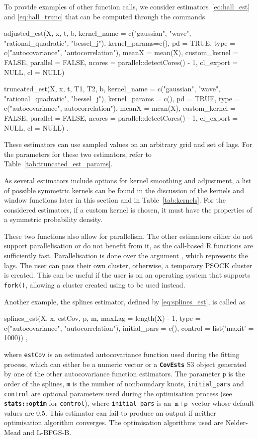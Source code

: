 To provide examples of other function calls, we consider estimators~\eqref{eq:hall_est} and \eqref{eq:hall_trunc} that can be computed through the commands
\begin{example}
adjusted_est(X, x, t, b,
        kernel_name = c("gaussian", "wave", "rational_quadratic", "bessel_j"),
        kernel_params=c(), pd = TRUE, type = c("autocovariance", "autocorrelation"),
        meanX = mean(X), custom_kernel = FALSE, parallel = FALSE,
        ncores = parallel::detectCores() - 1, cl_export = NULL, cl = NULL) 

truncated_est(X, x, t, T1, T2, b,
        kernel_name = c("gaussian", "wave", "rational_quadratic", "bessel_j"),
        kernel_params = c(), pd = TRUE, type = c("autocovariance", autocorrelation"),
        meanX = mean(X), custom_kernel = FALSE, parallel = FALSE,
        ncores = parallel::detectCores() - 1, cl_export = NULL, cl = NULL) .
\end{example}
These estimators can use sampled values on an arbitrary grid and set of lags.
For the parameters for these two estimators, refer to Table~\ref{tab:truncated_est_params}.

As several estimators include options for kernel smoothing and adjustment, a list of possible symmetric kernels can be found in the discussion of the kernels and window functions later in this section and in Table~\ref{tab:kernels}.
For the considered estimators, if a custom kernel is chosen, it must have the properties of a symmetric probability density.

These two functions also allow for parallelism. The other estimators either do not support parallelisation or do not benefit from it, as the call-based R functions are sufficiently fast. Parallelisation is done over the argument , which represents the lags. The user can pass their own cluster, otherwise, a temporary PSOCK cluster is created. This can be useful if the user is on an operating system that supports \texttt{fork()}, allowing a cluster created using  to be used instead.

Another example, the splines estimator, defined by \eqref{eq:splines_est}, is called as
\begin{example}
splines_est(X, x, estCov, p, m, maxLag = length(X) - 1,
        type = c("autocovariance", "autocorrelation"), initial_pars = c(),
        control = list('maxit' = 1000)) ,
\end{example}
where \texttt{estCov} is an estimated autocovariance function used during the fitting process, which can either be a numeric vector or a \textbf{\texttt{CovEsts}} S3 object generated by one of the other autocovariance function estimators. The parameter \texttt{p} is the order of the splines, \texttt{m} is the number of nonboundary knots, \texttt{initial\_pars} and \texttt{control} are optional parameters used during the optimisation process (see \textbf{\texttt{stats::optim}} for \texttt{control}), where \texttt{initial\_pars} is an \(\texttt{m} + \texttt{p}\) vector whose default values are 0.5. This estimator can fail to produce an output if neither optimisation algorithm converges. The optimisation algorithms used are Nelder-Mead and L-BFGS-B.

